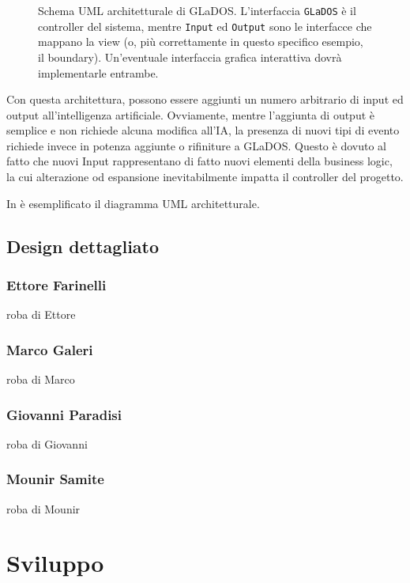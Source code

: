\documentclass[a4paper,12pt]{report}
\begin{document}
\begin{figure}[h]
\centering{}
\caption{Schema UML architetturale di GLaDOS. L'interfaccia \texttt{GLaDOS} è il controller del sistema, mentre \texttt{Input} ed \texttt{Output} sono le interfacce che mappano la view (o, più correttamente in questo specifico esempio, il boundary). Un'eventuale interfaccia grafica interattiva dovrà implementarle entrambe.}
\label{img:goodarch}
\end{figure}

Con questa architettura, possono essere aggiunti un numero arbitrario di input ed output
all'intelligenza artificiale.
%
Ovviamente, mentre l'aggiunta di output è semplice e non richiede alcuna modifica all'IA, la
presenza di nuovi tipi di evento richiede invece in potenza aggiunte o rifiniture a GLaDOS.
%
Questo è dovuto al fatto che nuovi Input rappresentano di fatto nuovi elementi della business
logic, la cui alterazione od espansione inevitabilmente impatta il controller del progetto.

In  è esemplificato il diagramma UML architetturale.

\section{Design dettagliato}

\subsection*{Ettore Farinelli}
roba di Ettore
\subsection*{Marco Galeri}
roba di Marco
\subsection*{Giovanni Paradisi}
roba di Giovanni
\subsection*{Mounir Samite}
roba di Mounir


\chapter{Sviluppo}
\end{document}
